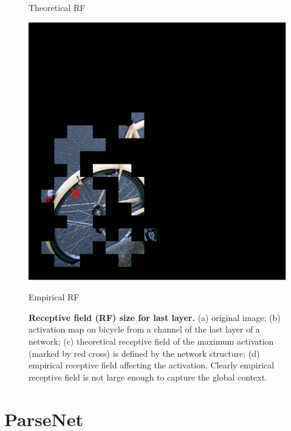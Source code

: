 \documentclass{article} %
\begin{document}
\begin{figure}
\begin{subtable}[b]{0.2\linewidth}
		\caption{Theoretical RF}
	\end{subtable}
    \hspace{1.8em}
	\begin{subtable}[b]{0.2\linewidth}
		\includegraphics[width=\linewidth]{figure/2009_004379_rfe0105.png}
		\caption{Empirical RF}
	\end{subtable}
	\caption{\textbf{Receptive field (RF) size for last layer.} (a) original image; (b) activation map on bicycle from a channel of the last layer of a network; (c) theoretical receptive field of the maximum activation (marked by red cross) is defined by the network structure; (d) empirical receptive field affecting the activation. Clearly empirical receptive field is not large enough to capture the global context.}
\label{fig:receptivefield}
\end{figure}
\section{ParseNet}
\label{sec:methods}
\end{document}
